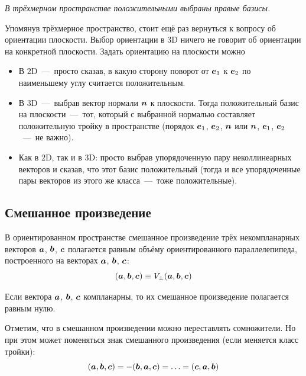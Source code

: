 \documentclass[a4paper,12pt]{article}
\begin{document}
  \emph{В трёхмерном пространстве положительными выбраны правые базисы.}
  
  Упомянув трёхмерное пространство, стоит ещё раз вернуться к вопросу об ориентации плоскости.
  Выбор ориентации в $3$D ничего не говорит об ориентации на конкретной плоскости.
  Задать ориентацию на плоскости можно
  \begin{itemize}
    \item В $2$D~---~просто сказав, в какую сторону поворот от $\boldsymbol e_1$ к $\boldsymbol e_2$ по наименьшему углу считается положительным.
    
    \item В $3$D~---~выбрав вектор нормали $\boldsymbol n$ к плоскости.
    Тогда положительный базис на плоскости~---~тот, который с выбранной нормалью составляет положительную тройку в пространстве (порядок $\boldsymbol e_1$, $\boldsymbol e_2$, $\boldsymbol n$ или $\boldsymbol n$, $\boldsymbol e_1$, $\boldsymbol e_2$~---~не важно).
    
    \item Как в $2$D, так и в $3$D: просто выбрав упорядоченную пару неколлинеарных векторов и сказав, что этот базис положительный (тогда и все упорядоченные пары векторов из этого же класса~---~тоже положительные).
  \end{itemize}

  
  \subsection{Смешанное произведение}
  
  \begin{definition}
    В ориентированном пространстве смешанное произведение трёх некомпланарных векторов $\boldsymbol a$, $\boldsymbol b$, $\boldsymbol c$ полагается равным объёму ориентированного параллелепипеда, построенного на векторах $\boldsymbol a$, $\boldsymbol b$, $\boldsymbol c$:
    \[
      (\boldsymbol a, \boldsymbol b, \boldsymbol c) \equiv V_{\pm}(\boldsymbol a, \boldsymbol b, \boldsymbol c)
    \]
    
    Если вектора $\boldsymbol a$, $\boldsymbol b$, $\boldsymbol c$ компланарны, то их смешанное произведение полагается равным нулю.
  \end{definition}
  
  Отметим, что в смешанном произведении можно переставлять сомножители.
  Но при этом может поменяться знак смешанного произведения (если меняется класс тройки):
  \begin{equation}\label{eq:triple-change-order}
    (\boldsymbol a, \boldsymbol b, \boldsymbol c) = -(\boldsymbol b, \boldsymbol a, \boldsymbol c) = \ldots = (\boldsymbol c, \boldsymbol a, \boldsymbol b)
  \end{equation}
  
\end{document}
